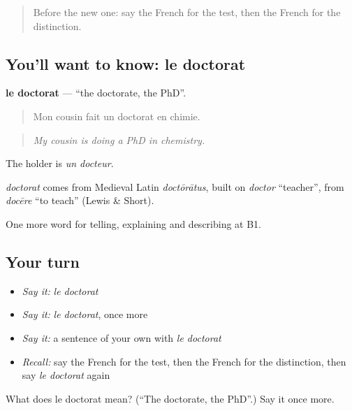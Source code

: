 \begin{quote}
Before the new one: say the French for the test, then the French for the distinction.
\end{quote}

\subsection*{You'll want to know: le doctorat}
\textbf{le doctorat} — \textquotedblleft{}the doctorate, the PhD\textquotedblright{}.

\begin{quote}
Mon cousin fait un doctorat en chimie.
\end{quote}

\begin{quote}
\emph{My cousin is doing a PhD in chemistry.}
\end{quote}

The holder is \emph{un docteur}.

\begin{cousinweb}
\emph{doctorat} comes from Medieval Latin \emph{doctōrātus}, built on \emph{doctor} \textquotedblleft{}teacher\textquotedblright{}, from \emph{docēre} \textquotedblleft{}to teach\textquotedblright{} (Lewis \& Short).
\end{cousinweb}

\begin{grammarlens}[title={What you've built}]
One more word for telling, explaining and describing at B1.
\end{grammarlens}

\subsection*{Your turn}
\begin{itemize}
\raggedright
  \item \emph{Say it:} \emph{le doctorat}
  \item \emph{Say it:} \emph{le doctorat}, once more
  \item \emph{Say it:} a sentence of your own with \emph{le doctorat}
  \item \emph{Recall:} say the French for the test, then the French for the distinction, then say \emph{le doctorat} again
\end{itemize}

\begin{tcolorbox}[breakable,colback=teal!4,colframe=teal!35!black,title={Before you move on}]
What does le doctorat mean? (\textquotedblleft{}The doctorate, the PhD\textquotedblright{}.) Say it once more.
\end{tcolorbox}

